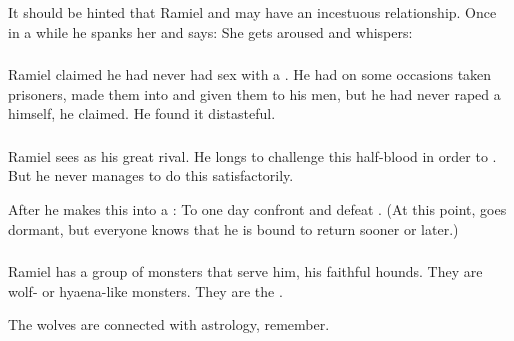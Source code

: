 It should be hinted that Ramiel and \Cishiel may have an incestuous relationship. 
Once in a while he spanks her and says: 
She gets aroused and whispers: 





\subsubsection{\Yurideth}
Ramiel claimed he had never had sex with a .
He had on some occasions taken prisoners, made them into \yurideth and given them to his men, but he had never raped a \yurid himself, he claimed.
He found it distasteful.





\subsubsection{\Vizsherioch}
Ramiel sees \Vizsherioch{} as his great rival. 
He longs to challenge this half-blood \xs{} in order to . 
But he never manages to do this satisfactorily. 

After  he makes this into a : To one day confront and defeat \Vizsherioch. 
(At this point, \Vizsherioch{} goes dormant, but everyone knows that he is bound to return sooner or later.) 





\subsubsection{\Vorcanth}
Ramiel has a group of monsters that serve him, his faithful hounds. 
They are wolf- or hyaena-like monsters. 
They are the . 


The wolves are connected with astrology, remember. 

